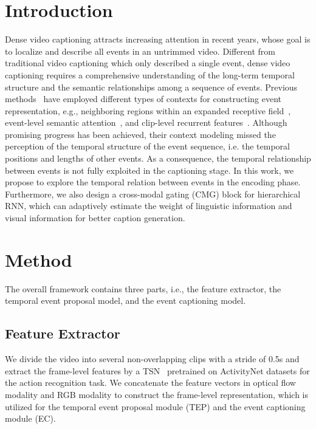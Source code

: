\documentclass[10pt,twocolumn,letterpaper]{article}
\begin{document}
\section{Introduction}
Dense video captioning attracts increasing attention in recent years, whose goal is to localize and describe all events in an untrimmed video. Different from traditional video captioning which only described a single event, dense video captioning requires a comprehensive understanding of the long-term temporal structure and the semantic relationships among a sequence of events. Previous methods~\cite{chen2019activitynet,krishna2017dense,wang2018bidirectional} have employed different types of contexts for constructing event representation, e.g., neighboring regions within an expanded receptive field~\cite{chen2019activitynet}, event-level semantic  attention~\cite{krishna2017dense}, and clip-level recurrent features~\cite{wang2018bidirectional,chen2019activitynet,yang2018hierarchical}. Although promising progress has been achieved, their context modeling missed the perception of the temporal structure of the event sequence, i.e. the temporal positions and lengths of other events. As a consequence, the temporal relationship between events is not fully exploited in the captioning stage. In this work, we propose to explore the temporal relation between events in the encoding phase. Furthermore, we also design a cross-modal gating (CMG) block for hierarchical RNN, which can adaptively estimate the weight of linguistic information and visual information for better caption generation.

\section{Method}
The overall framework contains three parts, i.e., the feature extractor, the temporal event proposal model, and the event captioning model.


\subsection{Feature Extractor}
We divide the video into several non-overlapping clips with a stride of 0.5s and extract the frame-level features by a TSN~\cite{xiong2016cuhk} pretrained on ActivityNet datasets for the action recognition task. We concatenate the feature vectors in optical flow modality and RGB modality to construct the frame-level representation,  which is utilized for the temporal event proposal module (TEP) and the event captioning module (EC).
\end{document}
